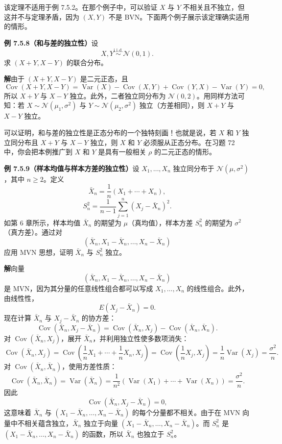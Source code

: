 \documentclass[UTF8,12pt,a4paper,fontset=fandol]{ctexart}
\begin{document}
该定理不适用于例 7.5.2。在那个例子中，可以验证 $X$ 与 $Y$ 不相关且不独立，但这并不与定理矛盾，因为 $(X,Y)$ 不是 BVN。下面两个例子展示该定理确实适用的情形。

\noindent\textbf{例 7.5.8（和与差的独立性）}\quad 设
\[
  X,Y\stackrel{\text{i.i.d.}}{\sim}\mathcal{N}(0,1).
\]
求 $(X+Y,X-Y)$ 的联合分布。

\noindent\textbf{解}\quad 由于 $(X+Y,X-Y)$ 是二元正态，且
\[
  \operatorname{Cov}(X+Y,X-Y)
  =\operatorname{Var}(X)-\operatorname{Cov}(X,Y)+\operatorname{Cov}(Y,X)-\operatorname{Var}(Y)=0,
\]
所以 $X+Y$ 与 $X-Y$ 独立。此外，二者独立同分布为 $\mathcal{N}(0,2)$。用同样方法可知：若 $X\sim \mathcal{N}(\mu_1,\sigma^2)$ 与 $Y\sim \mathcal{N}(\mu_2,\sigma^2)$ 独立（方差相同），则 $X+Y$ 与 $X-Y$ 独立。

可以证明，和与差的独立性是正态分布的一个独特刻画！也就是说，若 $X$ 和 $Y$ 独立同分布且 $X+Y$ 与 $X-Y$ 独立，则 $X$ 和 $Y$ 必须服从正态分布。在习题 72 中，你会把本例推广到 $X$ 和 $Y$ 是具有一般相关 $\rho$ 的二元正态的情形。

\noindent\textbf{例 7.5.9（样本均值与样本方差的独立性）}\quad 设 $X_1,\ldots,X_n$ 独立同分布于 $\mathcal{N}(\mu,\sigma^2)$，其中 $n\ge 2$。定义
\[
  \bar X_n=\frac1n(X_1+\cdots+X_n),
\]
\[
  S_n^2=\frac{1}{n-1}\sum_{j=1}^{n}(X_j-\bar X_n)^2.
\]
如第 6 章所示，样本均值 $\bar X_n$ 的期望为 $\mu$（真均值），样本方差 $S_n^2$ 的期望为 $\sigma^2$（真方差）。通过对
\[
  (\bar X_n,X_1-\bar X_n,\ldots,X_n-\bar X_n)
\]
应用 MVN 思想，证明 $\bar X_n$ 与 $S_n^2$ 独立。

\noindent\textbf{解}\quad 向量
\[
  (\bar X_n,X_1-\bar X_n,\ldots,X_n-\bar X_n)
\]
是 MVN，因为其分量的任意线性组合都可以写成 $X_1,\ldots,X_n$ 的线性组合。此外，由线性性，
\[
  E(X_j-\bar X_n)=0.
\]
现在计算 $\bar X_n$ 与 $X_j-\bar X_n$ 的协方差：
\[
  \operatorname{Cov}(\bar X_n,X_j-\bar X_n)
  =\operatorname{Cov}(\bar X_n,X_j)-\operatorname{Cov}(\bar X_n,\bar X_n).
\]
对 $\operatorname{Cov}(\bar X_n,X_j)$，展开 $\bar X_n$，并利用独立性使多数项消失：
\[
  \operatorname{Cov}(\bar X_n,X_j)
  =\operatorname{Cov}\left(\frac1nX_1+\cdots+\frac1nX_n,X_j\right)
  =\operatorname{Cov}\left(\frac1nX_j,X_j\right)
  =\frac1n\operatorname{Var}(X_j)
  =\frac{\sigma^2}{n}.
\]
对 $\operatorname{Cov}(\bar X_n,\bar X_n)$，使用方差性质：
\[
  \operatorname{Cov}(\bar X_n,\bar X_n)
  =\operatorname{Var}(\bar X_n)
  =\frac{1}{n^2}\left(\operatorname{Var}(X_1)+\cdots+\operatorname{Var}(X_n)\right)
  =\frac{\sigma^2}{n}.
\]
因此
\[
  \operatorname{Cov}(\bar X_n,X_j-\bar X_n)=0,
\]
这意味着 $\bar X_n$ 与 $(X_1-\bar X_n,\ldots,X_n-\bar X_n)$ 的每个分量都不相关。由于在 MVN 向量中不相关蕴含独立，$\bar X_n$ 独立于向量 $(X_1-\bar X_n,\ldots,X_n-\bar X_n)$。而 $S_n^2$ 是 $(X_1-\bar X_n,\ldots,X_n-\bar X_n)$ 的函数，所以 $\bar X_n$ 也独立于 $S_n^2$。
\end{document}
